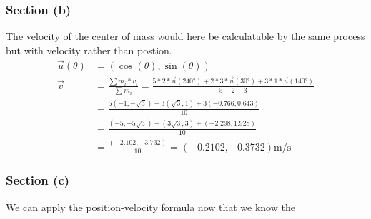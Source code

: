 \documentclass[12pt]{article}
\begin{document}
\subsubsection*{Section (b)}
The velocity of the center of mass would here be calculatable by the same process but with velocity rather than postion.
\begin{align}
    \vec{u}(\theta) &=  (\cos(\theta),\sin(\theta))\\
    \vec{v} &=  \frac{\sum m_i*v_i}{\sum m_i}
            =   \frac{5*2*\vec{u}(240\unit{\degree}) + 2*3*\vec{u}(30\unit{\degree}) + 3*1*\vec{u}(140\unit{\degree})}{5 + 2 + 3}\\
            &=  \frac{5(-1,-\sqrt{3}) + 3(\sqrt{3},1) + 3(-0.766,0.643)}{10}\\
            &=  \frac{(-5,-5\sqrt{3}) + (3\sqrt{3},3) + (-2.298, 1.928)}{10}\\
            &=  \frac{(-2.102,-3.732)}{10}
            =   \boxed{(-0.2102,-0.3732) \unit{\meter/\second}}
\end{align}

\subsubsection*{Section (c)}
We can apply the position-velocity formula now that we know the 
\end{document}
